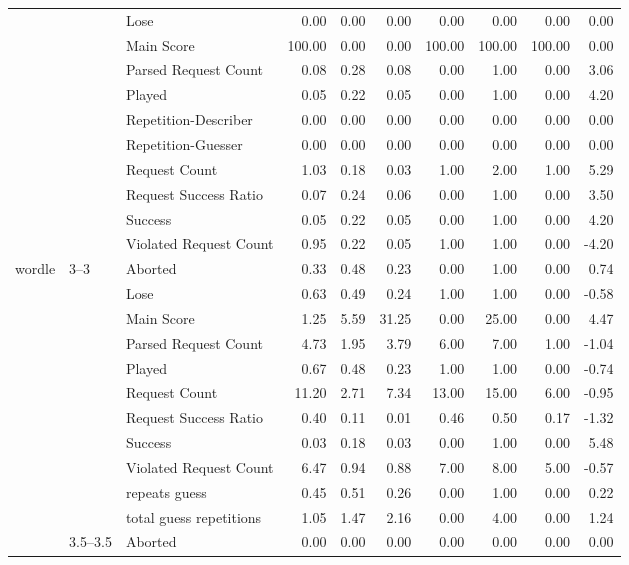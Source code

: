 \begin{tabular}{lllrrrrrrr}
 &  & Lose & 0.00 & 0.00 & 0.00 & 0.00 & 0.00 & 0.00 & 0.00 \\
 &  & Main Score & 100.00 & 0.00 & 0.00 & 100.00 & 100.00 & 100.00 & 0.00 \\
 &  & Parsed Request Count & 0.08 & 0.28 & 0.08 & 0.00 & 1.00 & 0.00 & 3.06 \\
 &  & Played & 0.05 & 0.22 & 0.05 & 0.00 & 1.00 & 0.00 & 4.20 \\
 &  & Repetition-Describer & 0.00 & 0.00 & 0.00 & 0.00 & 0.00 & 0.00 & 0.00 \\
 &  & Repetition-Guesser & 0.00 & 0.00 & 0.00 & 0.00 & 0.00 & 0.00 & 0.00 \\
 &  & Request Count & 1.03 & 0.18 & 0.03 & 1.00 & 2.00 & 1.00 & 5.29 \\
 &  & Request Success Ratio & 0.07 & 0.24 & 0.06 & 0.00 & 1.00 & 0.00 & 3.50 \\
 &  & Success & 0.05 & 0.22 & 0.05 & 0.00 & 1.00 & 0.00 & 4.20 \\
 &  & Violated Request Count & 0.95 & 0.22 & 0.05 & 1.00 & 1.00 & 0.00 & -4.20 \\
\cline{1-10} \cline{2-10}
\multirow[t]{99}{*}{wordle} & \multirow[t]{11}{*}{3--3} & Aborted & 0.33 & 0.48 & 0.23 & 0.00 & 1.00 & 0.00 & 0.74 \\
 &  & Lose & 0.63 & 0.49 & 0.24 & 1.00 & 1.00 & 0.00 & -0.58 \\
 &  & Main Score & 1.25 & 5.59 & 31.25 & 0.00 & 25.00 & 0.00 & 4.47 \\
 &  & Parsed Request Count & 4.73 & 1.95 & 3.79 & 6.00 & 7.00 & 1.00 & -1.04 \\
 &  & Played & 0.67 & 0.48 & 0.23 & 1.00 & 1.00 & 0.00 & -0.74 \\
 &  & Request Count & 11.20 & 2.71 & 7.34 & 13.00 & 15.00 & 6.00 & -0.95 \\
 &  & Request Success Ratio & 0.40 & 0.11 & 0.01 & 0.46 & 0.50 & 0.17 & -1.32 \\
 &  & Success & 0.03 & 0.18 & 0.03 & 0.00 & 1.00 & 0.00 & 5.48 \\
 &  & Violated Request Count & 6.47 & 0.94 & 0.88 & 7.00 & 8.00 & 5.00 & -0.57 \\
 &  & repeats guess & 0.45 & 0.51 & 0.26 & 0.00 & 1.00 & 0.00 & 0.22 \\
 &  & total guess repetitions & 1.05 & 1.47 & 2.16 & 0.00 & 4.00 & 0.00 & 1.24 \\
\cline{2-10}
 & \multirow[t]{11}{*}{3.5--3.5} & Aborted & 0.00 & 0.00 & 0.00 & 0.00 & 0.00 & 0.00 & 0.00 \\

\end{tabular}
